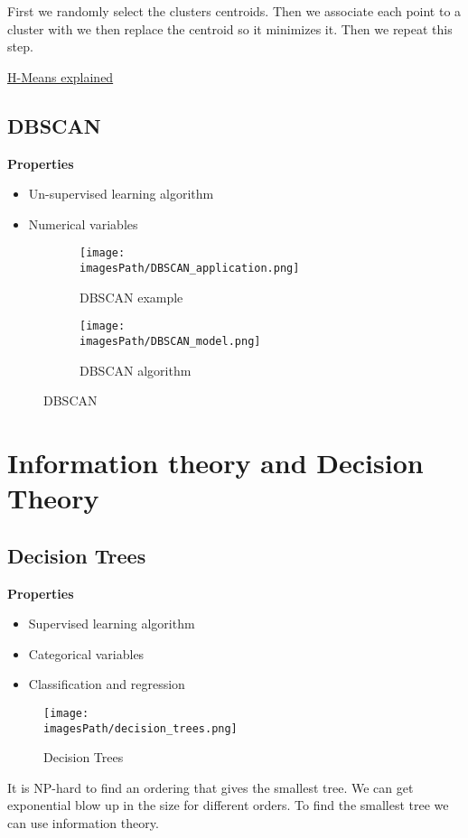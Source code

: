 \documentclass{article}
\newcommand{\imagesPath}{images}
\begin{document}
First we randomly select the clusters centroids. Then we associate each 
point to a cluster with we then replace the centroid so it minimizes it.
Then we repeat this step.  

\href{https://www.youtube.com/watch?v=4b5d3muPQmA}{H-Means explained}

\subsection{DBSCAN}
\textbf{Properties}
\begin{itemize}
    \item Un-supervised learning algorithm
    \item Numerical variables 
\end{itemize}


\begin{figure}[!h]
     \centering
     \begin{subfigure}[b]{0.4\textwidth}
         \centering
         \texttt{[image: \\imagesPath/DBSCAN\_application.png]}
         \caption{DBSCAN example}
     \end{subfigure}
     \hfill
     \begin{subfigure}[b]{0.4\textwidth}
         \centering
         \texttt{[image: \\imagesPath/DBSCAN\_model.png]}
         \caption{DBSCAN algorithm}
     \end{subfigure}
    \caption{DBSCAN}
    \label{fig:DBSCAN}
\end{figure}



\section{Information theory and Decision Theory}
\subsection{Decision Trees}
\textbf{Properties}
\begin{itemize}
    \item Supervised learning algorithm
    \item Categorical variables 
    \item Classification and regression
\end{itemize}

\begin{figure}[!h]
    \centering
    \texttt{[image: \\imagesPath/decision\_trees.png]}
    \caption{Decision Trees}
\end{figure}
It is NP-hard to find an ordering that gives the smallest tree.
We can get exponential blow up in the size for different orders.
To find the smallest tree we can use information theory.
\end{document}

